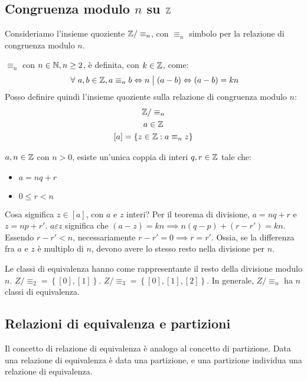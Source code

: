 \subsection{Congruenza modulo $n$ su $\mathbb{Z}$}

Consideriamo l'insieme quoziente $\mathbb{Z} / \equiv_{n}$, con $\equiv_{n} $ simbolo per la relazione di congruenza modulo $n$.

$\equiv_{n}$ con $n \in \mathbb{N}, n \ge 2$, \`e definita, con $ k \in \mathbb{Z}$, come:
\[
\forall a, b \in \integers, a \equiv_{n} b \iff n \divides (a - b) \iff (a - b) = k n 
\]
Posso definire quindi l'insieme quoziente sulla relazione di congruenza modulo $n$:
\begin{gather*}
\mathbb{Z} / \equiv_{n} \\
a \in \mathbb{Z} \\
[a] = \left \{ z \in \mathbb{Z} : a \equiv_{n} z \right \}
\end{gather*}

\begin{theorem}
$a, n \in \mathbb{Z}$ con $n > 0$, esiste un'unica coppia di interi $q, r \in \mathbb{Z}$ tale che:
\begin{itemize}
  \item $a = n q + r$
  \item $0 \le r < n$
\end{itemize}
\end{theorem}
Cosa significa $z \in [a]$, con $a$ e $z$ interi? Per il teorema di divisione, $a = n q + r$ e $z = n p + r'$. $a \varepsilon z $ significa che $ (a - z) = k n \implies n (q - p) + (r - r') = kn $. Essendo $r - r' < n$, necessariamente $r - r' = 0 \implies r = r'$. Ossia, se la differenza fra $a$ e $z$ \`e multiplo di $n$, devono avere lo stesso resto nella divisione per $n$.

Le classi di equivalenza hanno come rappresentante il resto della divisione modulo $n$. $Z / \equiv_{2} = \left \{ [0], [1] \right \}$. $Z / \equiv_{3} = \left \{ [0], [1], [2] \right \}$. In generale, $Z / \equiv_{n}$ ha $n$ classi di equivalenza.

\subsection{Relazioni di equivalenza e partizioni}

Il concetto di relazione di equivalenza \`e analogo al concetto di partizione. Data una relazione di equivalenza \`e data una partizione, e una partizione individua una relazione di equivalenza.

